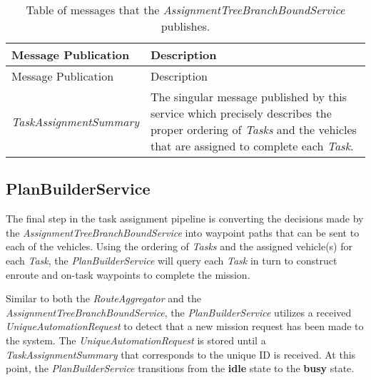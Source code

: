 \begin{longtable}[c]{@{}ll@{}}
\caption{Table of messages that the
\emph{AssignmentTreeBranchBoundService} publishes.}\tabularnewline
\toprule
\begin{minipage}[b]{0.29\columnwidth}\raggedright\strut
Message Publication
\strut\end{minipage} &
\begin{minipage}[b]{0.65\columnwidth}\raggedright\strut
Description
\strut\end{minipage}\tabularnewline
\midrule
\endfirsthead
\toprule
\begin{minipage}[b]{0.29\columnwidth}\raggedright\strut
Message Publication
\strut\end{minipage} &
\begin{minipage}[b]{0.65\columnwidth}\raggedright\strut
Description
\strut\end{minipage}\tabularnewline
\midrule
\endhead
\begin{minipage}[t]{0.29\columnwidth}\raggedright\strut
\emph{TaskAssignmentSummary}
\strut\end{minipage} &
\begin{minipage}[t]{0.65\columnwidth}\raggedright\strut
The singular message published by this service which precisely describes
the proper ordering of \emph{Tasks} and the vehicles that are assigned
to complete each \emph{Task}.
\strut\end{minipage}\tabularnewline
\bottomrule
\end{longtable}

\subsection{PlanBuilderService}\label{planbuilderservice}

The final step in the task assignment pipeline is converting the
decisions made by the \emph{AssignmentTreeBranchBoundService} into
waypoint paths that can be sent to each of the vehicles. Using the
ordering of \emph{Tasks} and the assigned vehicle(s) for each
\emph{Task}, the \emph{PlanBuilderService} will query each \emph{Task}
in turn to construct enroute and on-task waypoints to complete the
mission.

Similar to both the \emph{RouteAggregator} and the
\emph{AssignmentTreeBranchBoundService}, the \emph{PlanBuilderService}
utilizes a received \emph{UniqueAutomationRequest} to detect that a new
mission request has been made to the system. The
\emph{UniqueAutomationRequest} is stored until a
\emph{TaskAssignmentSummary} that corresponds to the unique ID is
received. At this point, the \emph{PlanBuilderService} transitions from
the \textbf{idle} state to the \textbf{busy} state.

